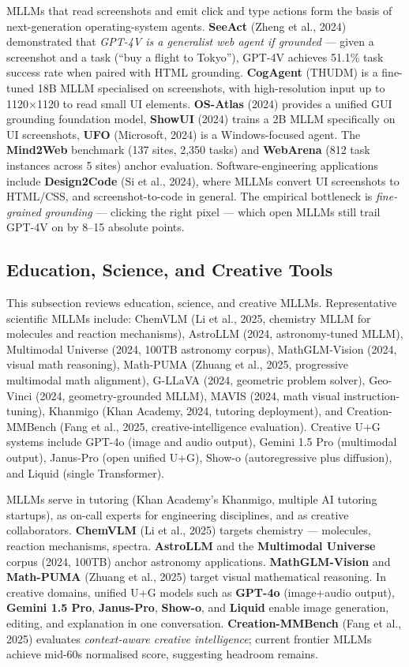 MLLMs that read screenshots and emit click and type actions form the basis of next-generation operating-system agents. \textbf{SeeAct} (Zheng et al., 2024) demonstrated that \emph{GPT-4V is a generalist web agent if grounded} --- given a screenshot and a task (``buy a flight to Tokyo''), GPT-4V achieves 51.1\% task success rate when paired with HTML grounding. \textbf{CogAgent} (THUDM) is a fine-tuned 18B MLLM specialised on screenshots, with high-resolution input up to 1120×1120 to read small UI elements. \textbf{OS-Atlas} (2024) provides a unified GUI grounding foundation model, \textbf{ShowUI} (2024) trains a 2B MLLM specifically on UI screenshots, \textbf{UFO} (Microsoft, 2024) is a Windows-focused agent. The \textbf{Mind2Web} benchmark (137 sites, 2,350 tasks) and \textbf{WebArena} (812 task instances across 5 sites) anchor evaluation. Software-engineering applications include \textbf{Design2Code} (Si et al., 2024), where MLLMs convert UI screenshots to HTML/CSS, and screenshot-to-code in general. The empirical bottleneck is \emph{fine-grained grounding} --- clicking the right pixel --- which open MLLMs still trail GPT-4V on by 8--15 absolute points.

\subsection{Education, Science, and Creative Tools}\label{education-science-and-creative-tools}

This subsection reviews education, science, and creative MLLMs. Representative scientific MLLMs include: ChemVLM (Li et al., 2025, chemistry MLLM for molecules and reaction mechanisms), AstroLLM (2024, astronomy-tuned MLLM), Multimodal Universe (2024, 100TB astronomy corpus), MathGLM-Vision (2024, visual math reasoning), Math-PUMA (Zhuang et al., 2025, progressive multimodal math alignment), G-LLaVA (2024, geometric problem solver), Geo-Vinci (2024, geometry-grounded MLLM), MAVIS (2024, math visual instruction-tuning), Khanmigo (Khan Academy, 2024, tutoring deployment), and Creation-MMBench (Fang et al., 2025, creative-intelligence evaluation). Creative U+G systems include GPT-4o (image and audio output), Gemini 1.5 Pro (multimodal output), Janus-Pro (open unified U+G), Show-o (autoregressive plus diffusion), and Liquid (single Transformer).

MLLMs serve in tutoring (Khan Academy's Khanmigo, multiple AI tutoring startups), as on-call experts for engineering disciplines, and as creative collaborators. \textbf{ChemVLM} (Li et al., 2025) targets chemistry --- molecules, reaction mechanisms, spectra. \textbf{AstroLLM} and the \textbf{Multimodal Universe} corpus (2024, 100TB) anchor astronomy applications. \textbf{MathGLM-Vision} and \textbf{Math-PUMA} (Zhuang et al., 2025) target visual mathematical reasoning. In creative domains, unified U+G models such as \textbf{GPT-4o} (image+audio output), \textbf{Gemini 1.5 Pro}, \textbf{Janus-Pro}, \textbf{Show-o}, and \textbf{Liquid} enable image generation, editing, and explanation in one conversation. \textbf{Creation-MMBench} (Fang et al., 2025) evaluates \emph{context-aware creative intelligence}; current frontier MLLMs achieve mid-60s normalised score, suggesting headroom remains.

